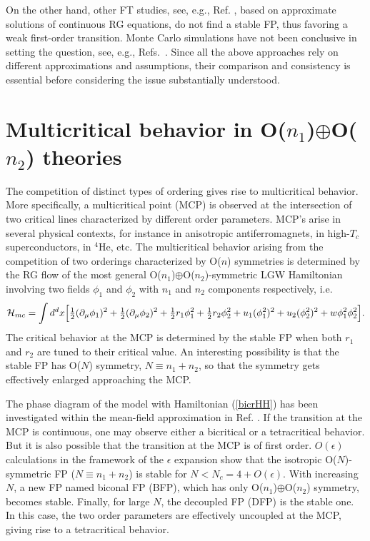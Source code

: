 \documentclass[a4paper,12pt]{article}
\def\case#1#2{{\textstyle\frac{#1}{#2}}}
\begin{document}
On the other hand, other FT studies, see, e.g., Ref. \cite{TDM-00},
based on approximate solutions of continuous RG equations,
do not find a stable FP, thus favoring a weak first-order transition.
Monte Carlo simulations have not been conclusive in setting the question, 
see, e.g., Refs.~\cite{LS-98,Itakura-01,PS-02}.
Since all the above approaches rely on  
different approximations and assumptions, their comparison and consistency 
is essential before considering the issue substantially understood.





\section{Multicritical behavior in O($n_1$)$\oplus$O($n_2$) theories}
\label{multi}

The competition of distinct types of ordering gives rise to multicritical
behavior. More specifically, a multicritical point (MCP) is observed at the 
intersection of two critical lines characterized by different order parameters.
MCP's arise in several physical contexts, for instance 
in anisotropic antiferromagnets, 
in high-$T_c$ superconductors, in $^4$He, etc.
The multicritical behavior arising from the
competition of two orderings characterized by O($n$) 
symmetries is determined by the RG flow of  the most general
O($n_1$)$\oplus$O($n_2$)-symmetric
LGW Hamiltonian involving two fields $\phi_1$ and $\phi_2$
with $n_1$ and $n_2$ components respectively, i.e.
\cite{KNF-76} 
\begin{eqnarray}
{\cal H}_{mc} = \int d^d x \Bigl[ 
\case{1}{2} ( \partial_\mu \phi_1)^2  + \case{1}{2} (
\partial_\mu \phi_2)^2 + \case{1}{2} r_1 \phi_1^2  
 + \case{1}{2} r_2 \phi_2^2  
+ u_1 (\phi_1^2)^2 + u_2 (\phi_2^2)^2 + w \phi_1^2\phi_2^2 \Bigr].
\label{bicrHH} 
\end{eqnarray}
The critical behavior at the MCP is determined 
by the stable FP when both $r_1$ and $r_2$ 
are tuned to their critical value.
An interesting possibility is that the stable FP has O($N$) symmetry, 
$N\equiv n_1 + n_2$, so that the symmetry gets effectively enlarged  
approaching the MCP.

The phase diagram of the model with
Hamiltonian (\ref{bicrHH}) has been investigated
within the mean-field approximation in Ref. \cite{LF-72}.
If the transition at the MCP is continuous, one may observe 
either a bicritical or a tetracritical behavior.
But it is also possible that the transition at the MCP is of first order.
$O(\epsilon)$  calculations in the framework of the 
$\epsilon$ expansion \cite{KNF-76} 
show that the isotropic O($N$)-symmetric FP ($N\equiv n_1 + n_2$)
is stable for $N<N_c=4 + O(\epsilon)$.
With increasing $N$, a new FP named biconal FP (BFP),
which has only O($n_1$)$\oplus$O($n_2$) symmetry, becomes stable. 
Finally, for large $N$, the decoupled FP (DFP)
is the stable one. In this case, the two order parameters are 
effectively uncoupled at the MCP, giving rise to a tetracritical 
behavior. 
\end{document}
